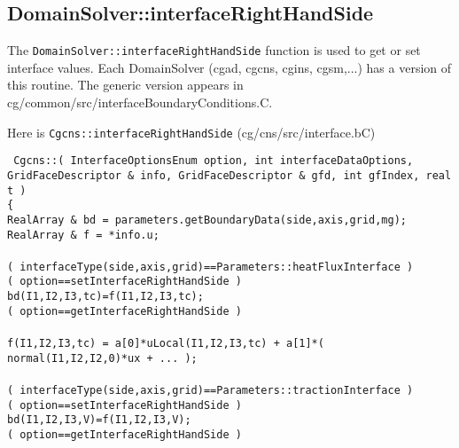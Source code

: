 \documentclass[11pt]{article}
\begin{document}
\clearpage
\subsection{DomainSolver::interfaceRightHandSide} \label{sec:DomainSolver::interfaceRightHandSide}


The {\tt DomainSolver::interfaceRightHandSide} function is used to get or set interface values.
Each DomainSolver (cgad, cgcns, cgins, cgsm,...) has a version of this routine. The generic
version appears in cg/common/src/interfaceBoundaryConditions.C. 


Here is {\tt Cgcns::interfaceRightHandSide} (cg/cns/src/interface.bC)
\begin{flushleft}\tt\small
Cgcns::( InterfaceOptionsEnum option, int interfaceDataOptions,  \\
 \qquad\quad       GridFaceDescriptor \& info, GridFaceDescriptor \& gfd, int gfIndex, real t ) \\
\{  \\
\ia  RealArray \& bd = parameters.getBoundaryData(side,axis,grid,mg); \\
\ia  RealArray \& f = *info.u;  \\
\ia \\
\ia  \IF( interfaceType(side,axis,grid)==Parameters::heatFluxInterface ) \\
\ib     \IF( option==setInterfaceRightHandSide ) \\
\ic       bd(I1,I2,I3,tc)=f(I1,I2,I3,tc);    \\
\ib     \ELSEIF( option==getInterfaceRightHandSide )  \\
\ic       {} \\
\ic       f(I1,I2,I3,tc) = a[0]*uLocal(I1,I2,I3,tc) + a[1]*( normal(I1,I2,I2,0)*ux + ... ); \\
\ia \\
\ia  \ELSEIF( interfaceType(side,axis,grid)==Parameters::tractionInterface ) \\
\ib     \IF( option==setInterfaceRightHandSide ) \\
\ic       bd(I1,I2,I3,V)=f(I1,I2,I3,V);    \\
\ib     \ELSEIF( option==getInterfaceRightHandSide )  \\

\end{flushleft}
\end{document}
